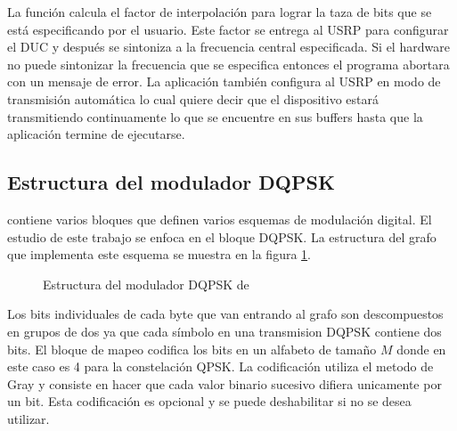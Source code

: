 La funci\'on calcula el factor de interpolaci\'on para lograr la taza de bits que se est\'a
especificando por el usuario. Este factor se entrega al USRP para configurar el DUC y despu\'es se
sintoniza a la frecuencia central especificada. Si el hardware no puede sintonizar la frecuencia que
se especifica entonces el programa abortara con un mensaje de error. La aplicaci\'on tambi\'en
configura al USRP en modo de transmisi\'on autom\'atica lo cual quiere decir que el dispositivo
estar\'a transmitiendo continuamente lo que se encuentre en sus buffers hasta que la aplicaci\'on
termine de ejecutarse.

\subsection{Estructura del modulador DQPSK}\label{subsec:estrucdqpsk}
\gnuradio contiene varios bloques que definen varios esquemas de modulaci\'on digital. El estudio de
este trabajo se enfoca en el bloque DQPSK. La estructura del grafo que implementa este esquema se
muestra en la figura \ref{fig:dqpsk}.

\begin{figure}[bp]
  \centering
  \vspace{0.5in}
  \vspace{0.3in}
  \caption{Estructura del modulador DQPSK de \gnuradio}
  \label{fig:dqpsk}
\end{figure}

Los bits individuales de cada byte que van entrando al grafo son descompuestos en grupos de dos ya
que cada s\'imbolo en una transmision DQPSK contiene dos bits. El bloque de mapeo codifica los bits
en un alfabeto de tama\~no $M$ donde en este caso es 4 para la constelaci\'on QPSK. La
codificaci\'on utiliza el metodo de Gray y consiste en hacer que cada valor binario sucesivo difiera
unicamente por un bit. Esta codificaci\'on es opcional y se puede deshabilitar si no se desea utilizar. 

